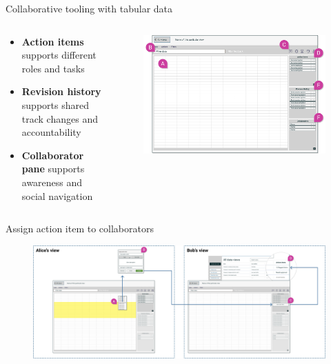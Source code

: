 \documentclass[aspectratio=169]{beamer}
\makeatletter
\newenvironment{restoretext}%
    {\@parboxrestore%
     \begin{adjustwidth}{-8mm}{-8mm}%
                \begin{lrbox}{\restorebox}%
                \begin{minipage}{\linewidth}%
    }{\end{minipage}\end{lrbox}
        \usebox\restorebox
        \end{adjustwidth}
     }
\makeatother
\begin{document}
\begin{frame}{Collaborative tooling with tabular data}
    \begin{columns}
        \begin{column}{0.4\textwidth}
            \begin{itemize}
                \small
                \item \textbf{Action items} supports different roles and tasks
                \item \textbf{Revision history} supports shared track changes and accountability
                \item \textbf{Collaborator pane} supports awareness and social navigation
            \end{itemize}
        \end{column}
        \begin{column}{0.6\textwidth}
            \begin{figure}[h]
                \centering
                \includegraphics[width=1\textwidth]{images/filter-view-with-marks.png}
            \end{figure}
        \end{column}
    \end{columns}
\end{frame}

\begin{frame}{Assign action item to collaborators}
    \vspace{2em}
    \begin{restoretext}
    \begin{figure}[h]
        \centering
        \includegraphics[width=1\textwidth]{images/assign-action-item.png}
    \end{figure}
\end{restoretext}
\end{frame}
\end{document}

